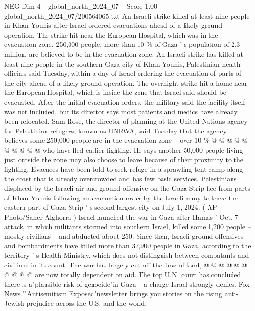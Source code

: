 \begin{textsample}{NEG Dim 4 – global\_north\_2024\_07 – Score 1.00 – global\_north\_2024\_07/200564065.txt}  \label{ex:f4_neg_265}
An Israeli strike killed at least nine people in Khan Younis after Israel ordered evacuations ahead of a likely ground operation.
The strike hit near the European Hospital, which was in the evacuation zone. 250,000 people, more than 10 \% of Gaza ' s population of 2.3 million, are believed to be in the evacuation zone.
An Israeli strike has killed at least nine people in the southern Gaza city of Khan Younis, Palestinian health officials said Tuesday, within a day of Israel ordering the evacuation of parts of the city ahead of a likely ground operation.
The overnight strike hit a home near the European Hospital, which is inside the zone that Israel said should be evacuated.
After the initial evacuation orders, the military said the facility itself was not included, but its director says most patients and medics have already been relocated.
Sam Rose, the director of planning at the United Nations agency for Palestinian refugees, known as UNRWA, said Tuesday that the agency believes some 250,000 people are in the evacuation zone -- over 10 \% @ @ @ @ @ @ @ @ @ @ who have fled earlier fighting.
He says another 50,000 people living just outside the zone may also choose to leave because of their proximity to the fighting.
Evacuees have been told to seek refuge in a sprawling tent camp along the coast that is already overcrowded and has few basic services.
Palestinians displaced by the Israeli air and ground offensive on the Gaza Strip flee from parts of Khan Younis following an evacuation order by the Israeli army to leave the eastern part of Gaza Strip ' s second-largest city on July 1, 2024. ( AP Photo/Saher Alghorra ) Israel launched the war in Gaza after Hamas ' Oct. 7 attack, in which militants stormed into southern Israel, killed some 1,200 people -- mostly civilians -- and abducted about 250.
Since then, Israeli ground offensives and bombardments have killed more than 37,900 people in Gaza, according to the territory ' s Health Ministry, which does not distinguish between combatants and civilians in its count.
The war has largely cut off the flow of food, @ @ @ @ @ @ @ @ @ @ are now totally dependent on aid.
The top U.N. court has concluded there is a"plausible risk of genocide"in Gaza -- a charge Israel strongly denies.
Fox News '"Antisemitism Exposed"newsletter brings you stories on the rising anti-Jewish prejudice across the U.S. and the world.

\end{textsample}
